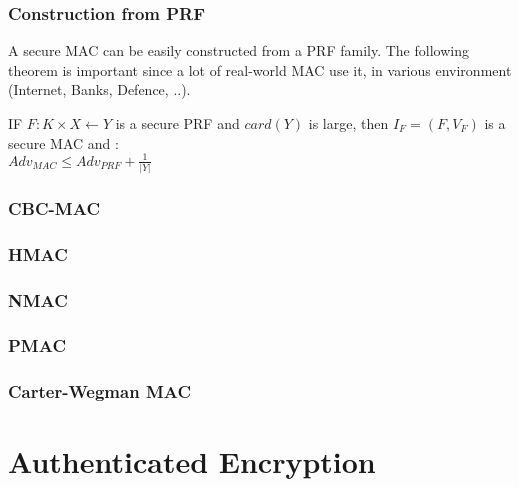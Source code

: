 \subsubsection{Construction from PRF}

A secure MAC can be easily constructed from a PRF family. The following theorem is important since a lot of real-world MAC use it, in various environment (Internet, Banks, Defence, ..).

\begin{mytheorem}
    IF $F:K\times X \leftarrow Y$ is a secure PRF and $card(Y)$ is large, then $I_F = (F, V_F)$ is a secure MAC and : \\
    $ Adv_{MAC} \leq Adv_{PRF} + \frac{1}{|Y|} $
\end{mytheorem}

\subsubsection{CBC-MAC}
\subsubsection{HMAC}
\subsubsection{NMAC}
\subsubsection{PMAC}
\subsubsection{Carter-Wegman MAC}


\section{Authenticated Encryption}	

